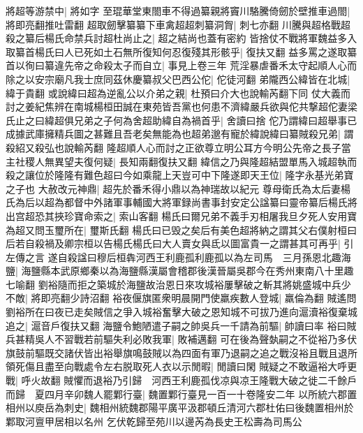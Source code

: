 將超等游禁中|{
	將如字}
至琨華堂東閤車不得過纂親將竇川駱騰倚劒於壁推車過閤|{
	將即亮翻推吐雷翻}
超取劒擊纂纂下車禽超超刺纂洞胷|{
	刺七亦翻}
川騰與超格戰超殺之纂后楊氏命禁兵討超杜尚止之|{
	超之結尚也蓋有密約}
皆捨仗不戰將軍魏益多入取纂首楊氏曰人已死如土石無所復知何忍復殘其形骸乎|{
	復扶又翻}
益多罵之遂取纂首以徇曰纂違先帝之命殺太子而自立|{
	事見上卷三年}
荒淫暴虐番禾太守起順人心而除之以安宗廟凡我士庶同茲休慶纂叔父巴西公佗|{
	佗徒河翻}
弟隴西公緯皆在北城|{
	緯于貴翻}
或說緯曰超為逆亂公以介弟之親|{
	杜預曰介大也說輸芮翻下同}
仗大義而討之姜紀焦辨在南城楊桓田誠在東苑皆吾黨也何患不濟緯嚴兵欲與佗共撃超佗妻梁氏止之曰緯超俱兄弟之子何為舍超助緯自為禍首乎|{
	舍讀曰捨}
佗乃謂緯曰超舉事已成據武庫擁精兵圖之甚難且吾老矣無能為也超弟邈有寵於緯說緯曰纂賊殺兄弟|{
	謂殺紹又殺弘也說輸芮翻}
隆超順人心而討之正欲尊立明公耳方今明公先帝之長子當主社稷人無異望夫復何疑|{
	長知兩翻復扶又翻}
緯信之乃與隆超結盟單馬入城超執而殺之讓位於隆隆有難色超曰今如乘龍上天豈可中下隆遂即天王位|{
	隆字永基光弟寶之子也}
大赦改元神鼎|{
	超先於番禾得小鼎以為神瑞故以紀元}
尊母衛氏為太后妻楊氏為后以超為都督中外諸軍事輔國大將軍録尚書事封安定公諡纂曰靈帝纂后楊氏將出宫超恐其挾珍寶命索之|{
	索山客翻}
楊氏曰爾兄弟不義手刃相屠我旦夕死人安用寶為超又問玉璽所在|{
	璽斯氏翻}
楊氏曰已毁之矣后有美色超將納之謂其父右僕射桓曰后若自殺禍及卿宗桓以告楊氏楊氏曰大人賣女與氐以圖富貴一之謂甚其可再乎|{
	引左傳之言}
遂自殺諡曰穆后桓犇河西王利鹿孤利鹿孤以為左司馬　三月孫恩北趣海鹽|{
	海鹽縣本武原鄉秦以為海鹽縣漢屬會稽郡後漢晉屬吳郡今在秀州東南八十里趣七喻翻}
劉裕隨而拒之築城於海鹽故治恩日來攻城裕屢擊破之斬其將姚盛城中兵少不敵|{
	將即亮翻少詩沼翻}
裕夜偃旗匿衆明晨開門使羸疾數人登城|{
	羸倫為翻}
賊遙問劉裕所在曰夜已走矣賊信之爭入城裕奮擊大破之恩知城不可拔乃進向滬瀆裕復棄城追之|{
	滬音戶復扶又翻}
海鹽令鮑陋遣子嗣之帥吳兵一千請為前驅|{
	帥讀曰率}
裕曰賊兵甚精吳人不習戰若前驅失利必敗我軍|{
	敗補邁翻}
可在後為聲埶嗣之不從裕乃多伏旗鼓前驅既交諸伏皆出裕舉旗鳴鼓賊以為四面有軍乃退嗣之追之戰沒裕且戰且退所領死傷且盡至向戰處令左右脱取死人衣以示閒暇|{
	閒讀曰閑}
賊疑之不敢逼裕大呼更戰|{
	呼火故翻}
賊懼而退裕乃引歸　河西王利鹿孤伐凉與凉王隆戰大破之徙二千餘戶而歸　夏四月辛卯魏人罷鄴行臺|{
	魏置鄴行臺見一百一十卷隆安二年}
以所統六郡置相州以庾岳為刺史|{
	魏相州統魏郡陽平廣平汲郡頓丘清河六郡杜佑曰後魏置相州於鄴取河亶甲居相以名州}
乞伏乾歸至苑川以邊芮為長史王松壽為司馬公

